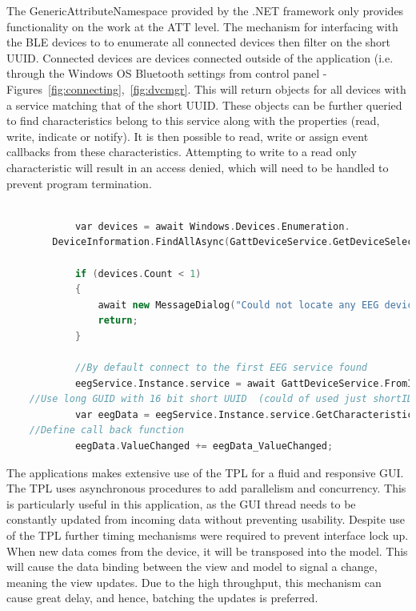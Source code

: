 \documentclass[]{article}
\begin{document}
The GenericAttributeNamespace provided by the .NET framework only provides functionality on the work at the \ac{ATT} level. The mechanism for interfacing with the \ac{BLE} devices to to enumerate all connected devices then filter on the short \ac{UUID}. Connected devices are devices connected outside of the application (i.e. through the Windows OS Bluetooth settings from control panel - Figures~\ref{fig:connecting},~\ref{fig:dvcmgr}. This will return objects for all devices with a service matching that of the short \ac{UUID}. These objects can be further queried to find characteristics belong to this service along with the properties (read, write, indicate or notify). It is then possible to read, write or assign event callbacks from these characteristics. Attempting to write to a read only characteristic will result in an access denied, which will need to be handled to prevent program termination.  

\begin{lstlisting}[language=C++, caption=Connecting to a \ac{BLE} device's \ac{EEG} service ,label={lst:csharpeble}]

            var devices = await Windows.Devices.Enumeration.
		DeviceInformation.FindAllAsync(GattDeviceService.GetDeviceSelectorFromShortId(0xEEE0));

            if (devices.Count < 1)
            {
                await new MessageDialog("Could not locate any EEG devices in the vinicity").ShowAsync();
                return;
            }

            //By default connect to the first EEG service found
            eegService.Instance.service = await GattDeviceService.FromIdAsync(devices[0].Id);
	//Use long GUID with 16 bit short UUID  (could of used just shortID) 
            var eegData = eegService.Instance.service.GetCharacteristics(new Guid("0000EEE1-0000-1000-8000-00805f9b34fb"))[0];
	//Define call back function
            eegData.ValueChanged += eegData_ValueChanged;

\end{lstlisting}

The applications makes extensive use of the \ac{TPL} for a fluid and responsive \ac{GUI}. The \ac{TPL} uses asynchronous procedures to add parallelism and concurrency. This is particularly useful in this application, as the \ac{GUI} thread needs to be constantly updated from incoming data without preventing usability. Despite use of the \ac{TPL} further timing mechanisms were required to prevent interface lock up. When new data comes from the device, it will be transposed into the model. This will cause the data binding between the view and model to signal a change, meaning the view updates. Due to the high throughput, this mechanism can cause great delay, and hence, batching the updates is preferred.
\end{document}
